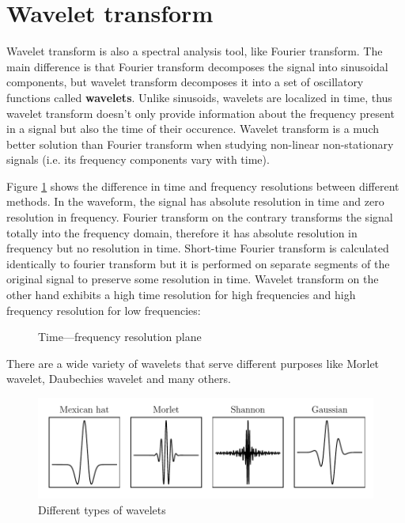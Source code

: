 \section{Wavelet transform}
Wavelet transform is also a spectral analysis tool, like Fourier transform. The main difference is that Fourier transform decomposes the signal into sinusoidal components, but wavelet transform decomposes it into a set of oscillatory functions called \textbf{wavelets}. Unlike sinusoids, wavelets are localized in time, thus wavelet transform doesn't only provide information about the frequency present in a signal but also the time of their occurence. Wavelet transform is a much better solution than Fourier transform when studying non-linear non-stationary signals (i.e. its frequency components vary with time).

Figure \ref{fig:time-frequency-plane} shows the difference in time and frequency resolutions between different methods. In the waveform, the signal has absolute resolution in time and zero resolution in frequency. Fourier transform on the contrary transforms the signal totally into the frequency domain, therefore it has absolute resolution in frequency but no resolution in time. Short-time Fourier transform is calculated identically to fourier transform but it is performed on separate segments of the original signal to preserve some resolution in time. Wavelet transform on the other hand exhibits a high time resolution for high frequencies and high frequency resolution for low frequencies:

\begin{figure}[H]
    \centering
    
    \caption{Time—frequency resolution plane}
    \label{fig:time-frequency-plane}
\end{figure}

There are a wide variety of wavelets that serve different purposes like Morlet wavelet, Daubechies wavelet and many others.

\begin{figure}[H]
    \centering
    \includegraphics{figures/wavelets.pdf}
    \caption{Different types of wavelets}
    \label{fig:wavelets}
\end{figure}

